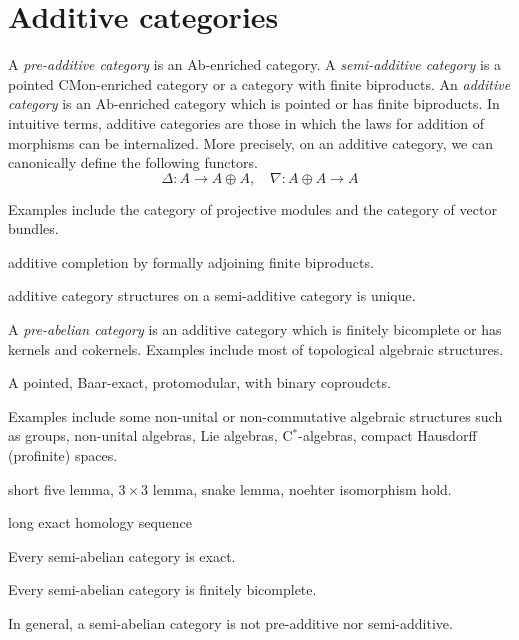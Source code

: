 \documentclass{../../large}
\begin{document}
\section{Additive categories}



\begin{prb}
A \emph{pre-additive category} is an $\mathrm{Ab}$-enriched category.
A \emph{semi-additive category} is a pointed $\mathrm{CMon}$-enriched category or a category with finite biproducts.
An \emph{additive category} is an $\mathrm{Ab}$-enriched category which is pointed or has finite biproducts.
In intuitive terms, additive categories are those in which the laws for addition of morphisms can be internalized.
More precisely, on an additive category, we can canonically define the following functors.
\[\Delta:A\to A\oplus A,\quad\nabla:A\oplus A\to A\]

Examples include the category of projective modules and the category of vector bundles.
\begin{parts}
\item additive completion by formally adjoining finite biproducts.
\item additive category structures on a semi-additive category is unique.
\end{parts}
\end{prb}


\begin{prb}
A \emph{pre-abelian category} is an additive category which is finitely bicomplete or has kernels and cokernels.
Examples include most of topological algebraic structures.
\begin{parts}
\item 
\end{parts}
\end{prb}

\begin{prb}
A pointed, Baar-exact, protomodular, with binary coproudcts.

Examples include some non-unital or non-commutative algebraic structures such as groups, non-unital algebras, Lie algebras, C$^*$-algebras, compact Hausdorff (profinite) spaces.
\begin{parts}
\item short five lemma, $3\times3$ lemma, snake lemma, noehter isomorphism hold.
\item long exact homology sequence
\item Every semi-abelian category is exact.
\item Every semi-abelian category is finitely bicomplete.
\item In general, a semi-abelian category is not pre-additive nor semi-additive.
\end{parts}
\end{prb}
\end{document}
